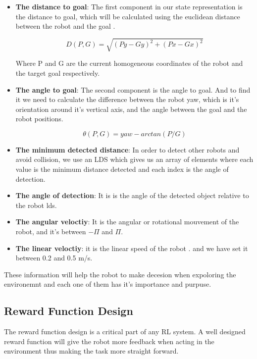 \documentclass[12pt]{extarticle}
\begin{document}
\begin{itemize}
\item \textbf{The distance to goal}: 
The first component in our state representation is the distance to goal, which will be calculated using the euclidean distance  between the robot and the goal .


\[ D(P,G)=\sqrt{(Py-Gy)^2+(Px-Gx)^2}  \] 

Where P and G are the current homogeneous coordinates of the robot and the target goal respectively.

\item \textbf{The angle to goal}: 
The second component  is the angle  to goal. And to find it we need to calculate  the difference between the robot yaw, which is it's orientation around it's vertical axis, and the angle between the goal and the robot positions.


\[ \theta(P,G)=yaw-arctan(P/G)  \] 


\item \textbf{The minimum detected distance}: 
In order to detect other robots and avoid collision, we use an  LDS   which gives us an array of elements where each value is the minimum distance detected and each index is the angle of detection.


\item \textbf{The angle of detection}: 
It is is the angle of the detected object relative to the robot lds.

\item \textbf{The angular veloctiy}: 
It is the angular or rotational mouvement of the robot, and it's between 
$ -\Pi $ and $\Pi$.

\item \textbf{The linear veloctiy}: 
it  is the linear speed of the robot . and we have set it between 0.2 and 0.5 m/s.

\end{itemize}

These information will help the robot to make decesion when expoloring the environemnt and each one of them has it's importance and purpuse.






\subsection{Reward Function Design}

The reward function design is a critical part of any RL system. A well designed reward function will give the  robot more feedback when acting in the environment thus making the task more straight forward.
\end{document}
